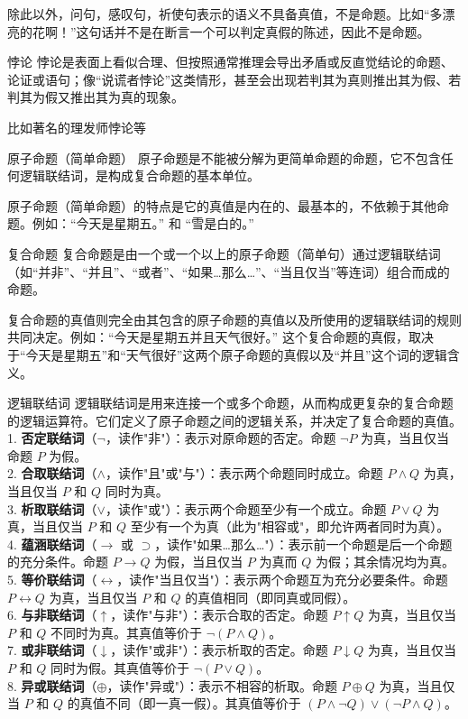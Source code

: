 除此以外，问句，感叹句，祈使句表示的语义不具备真值，不是命题。比如“多漂亮的花啊！”这句话并不是在断言一个可以判定真假的陈述，因此不是命题。
\begin{definition}{悖论}{}
悖论是表面上看似合理、但按照通常推理会导出矛盾或反直觉结论的命题、论证或语句；像“说谎者悖论”这类情形，甚至会出现若判其为真则推出其为假、若判其为假又推出其为真的现象。
\end{definition}
比如著名的理发师悖论等
\begin{definition}{原子命题（简单命题）}{}
原子命题是不能被分解为更简单命题的命题，它不包含任何逻辑联结词，是构成复合命题的基本单位。
\end{definition}
原子命题（简单命题）​ 的特点是它的真值是内在的、最基本的，不依赖于其他命题。例如：“今天是星期五。” 和 “雪是白的。”
\begin{definition}{复合命题}{}
复合命题是由一个或一个以上的原子命题（简单句）通过逻辑联结词（如“并非”、“并且”、“或者”、“如果…那么…”、“当且仅当”等连词）组合而成的命题。
\end{definition}
复合命题​的真值则完全由其包含的原子命题的真值以及所使用的逻辑联结词的规则共同决定。例如：“今天是星期五并且天气很好。” 这个复合命题的真假，取决于“今天是星期五”和“天气很好”这两个原子命题的真假以及“并且”这个词的逻辑含义。
\begin{definition}{逻辑联结词}{}
    逻辑联结词是用来连接一个或多个命题，从而构成更复杂的复合命题的逻辑运算符。它们定义了原子命题之间的逻辑关系，并决定了复合命题的真值。\\
    1. \textbf{否定联结词}（$\neg$，读作"非"）：表示对原命题的否定。命题 $\neg P$ 为真，当且仅当命题 $P$ 为假。\\
    2. \textbf{合取联结词}（$\land$，读作"且"或"与"）：表示两个命题同时成立。命题 $P \land Q$ 为真，当且仅当 $P$ 和 $Q$ 同时为真。\\
    3. \textbf{析取联结词}（$\lor$，读作"或"）：表示两个命题至少有一个成立。命题 $P \lor Q$ 为真，当且仅当 $P$ 和 $Q$ 至少有一个为真（此为"相容或"，即允许两者同时为真）。\\
    4. \textbf{蕴涵联结词}（$\rightarrow$ 或 $\supset$，读作"如果…那么…"）：表示前一个命题是后一个命题的充分条件。命题 $P \rightarrow Q$ 为假，当且仅当 $P$ 为真而 $Q$ 为假；其余情况均为真。\\
    5. \textbf{等价联结词}（$\leftrightarrow$，读作"当且仅当"）：表示两个命题互为充分必要条件。命题 $P \leftrightarrow Q$ 为真，当且仅当 $P$ 和 $Q$ 的真值相同（即同真或同假）。\\
    6. \textbf{与非联结词}（$\uparrow$，读作"与非"）：表示合取的否定。命题 $P \uparrow Q$ 为真，当且仅当 $P$ 和 $Q$ 不同时为真。其真值等价于 $\neg(P \land Q)$。\\
    7. \textbf{或非联结词}（$\downarrow$，读作"或非"）：表示析取的否定。命题 $P \downarrow Q$ 为真，当且仅当 $P$ 和 $Q$ 同时为假。其真值等价于 $\neg(P \lor Q)$。\\
    8. \textbf{异或联结词}（$\oplus$，读作"异或"）：表示不相容的析取。命题 $P \oplus Q$ 为真，当且仅当 $P$ 和 $Q$ 的真值不同（即一真一假）。其真值等价于 $(P \land \neg Q) \lor (\neg P \land Q)$。
\end{definition}
